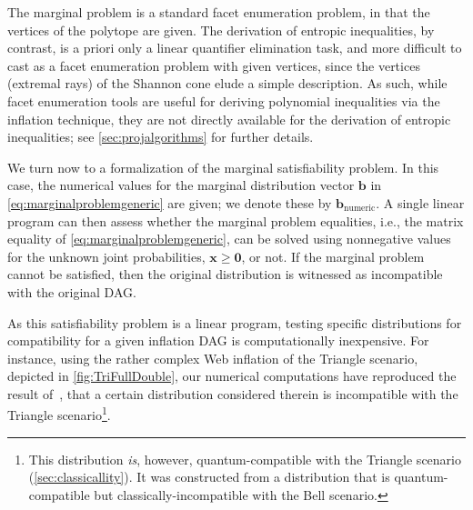 {The marginal problem is a standard facet enumeration problem, in that the vertices of the polytope are given. The derivation of entropic inequalities, by contrast, is a priori only a linear quantifier elimination task, and more difficult to cast as a facet enumeration problem with given vertices, since the vertices (extremal rays) of the Shannon cone elude a simple description. As such, while facet enumeration tools are useful for deriving polynomial inequalities via the inflation technique, they are not directly available for the derivation of entropic inequalities; see \cref{sec:projalgorithms} for further details.

\color{blue} We turn now to a formalization of the marginal satisfiability problem.  In this case, the numerical values for 
the marginal distribution vector $\bm{b}$ 
in \cref{eq:marginalproblemgeneric} are given; we denote these by $\bm{b}_{\text{numeric}}$. \color{black} A single linear program can then assess whether the marginal problem equalities, i.e., the matrix equality of \cref{eq:marginalproblemgeneric}, can be solved using nonnegative values for the unknown joint probabilities, $\bm{x} \geq \bm{0}$, or not. If the marginal problem cannot be satisfied, then the original distribution is witnessed as incompatible with the original DAG. 

As this satisfiability problem is a linear program, testing specific distributions for compatibility for a given inflation DAG is computationally inexpensive. For instance, using the rather complex Web inflation of the Triangle scenario, depicted in \cref{fig:TriFullDouble}, our numerical computations have reproduced the result of~\cite[Theorem~2.16]{fritz2012bell}, that a certain distribution considered therein is incompatible with the Triangle scenario\footnote{This distribution {\em is}, however, quantum-compatible with the Triangle scenario (\cref{sec:classicallity}).  It was constructed from a distribution that is quantum-compatible but classically-incompatible with the Bell scenario.}.

}
